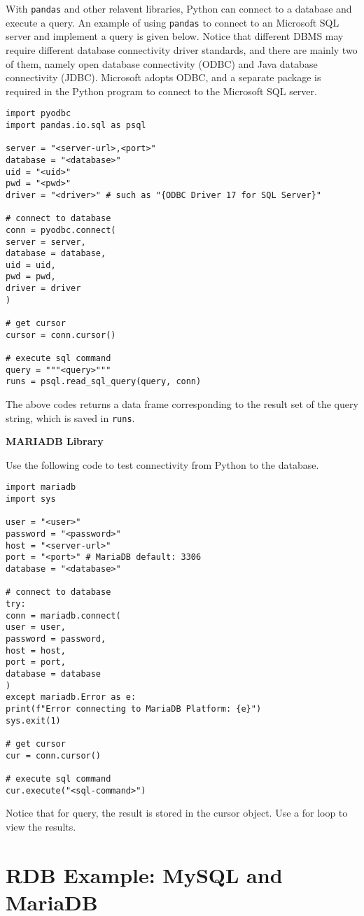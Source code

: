 With \verb|pandas| and other relavent libraries, Python can connect to a database and execute a query. An example of using \verb|pandas| to connect to an Microsoft SQL server and implement a query is given below. Notice that different DBMS may require different database connectivity driver standards, and there are mainly two of them, namely open database connectivity (ODBC) and Java database connectivity (JDBC). Microsoft adopts ODBC, and a separate package is required in the Python program to connect to the Microsoft SQL server.
\begin{lstlisting}
import pyodbc
import pandas.io.sql as psql

server = "<server-url>,<port>"
database = "<database>"
uid = "<uid>"
pwd = "<pwd>"
driver = "<driver>" # such as "{ODBC Driver 17 for SQL Server}"

# connect to database
conn = pyodbc.connect(
server = server,
database = database,
uid = uid,
pwd = pwd,
driver = driver
)

# get cursor
cursor = conn.cursor()

# execute sql command
query = """<query>"""
runs = psql.read_sql_query(query, conn)
\end{lstlisting}
The above codes returns a data frame corresponding to the result set of the query string, which is saved in \verb|runs|.

\vspace{0.1in}
\noindent \textbf{MARIADB Library}
\vspace{0.1in}

Use the following code to test connectivity from Python to the database.
\begin{lstlisting}
import mariadb
import sys

user = "<user>"
password = "<password>"
host = "<server-url>"
port = "<port>" # MariaDB default: 3306
database = "<database>"

# connect to database
try:
conn = mariadb.connect(
user = user,
password = password,
host = host,
port = port,
database = database
)
except mariadb.Error as e:
print(f"Error connecting to MariaDB Platform: {e}")
sys.exit(1)

# get cursor
cur = conn.cursor()

# execute sql command
cur.execute("<sql-command>")
\end{lstlisting}
Notice that for query, the result is stored in the cursor object. Use a for loop to view the results.

\chapter{RDB Example: MySQL and MariaDB} \label{ch:db:sec:mariadb}

